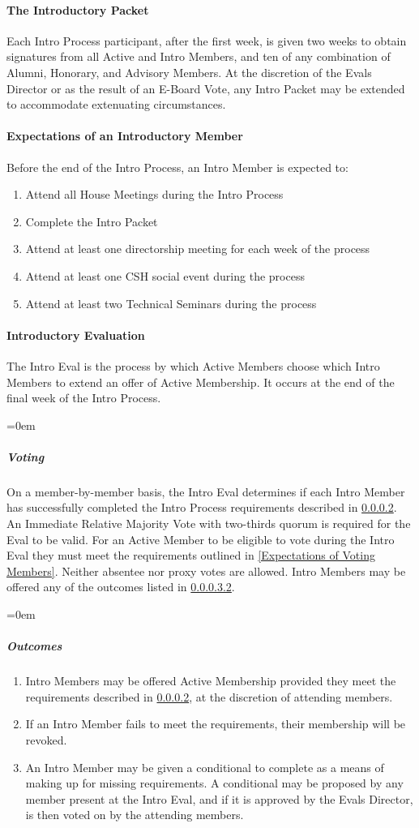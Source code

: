 \documentclass{article}
\newcommand{\asubsubsection}[1]{\paragraph{#1} \label{#1}}
\newcommand{\asubsubsubsection}[1]{\parindent=0em\subparagraph{#1} \label{#1}}
\begin{document}
\asubsubsection{The Introductory Packet}
Each Intro Process participant, after the first week, is given two weeks to obtain signatures from all Active and Intro Members, and ten of any combination of Alumni, Honorary, and Advisory Members.
At the discretion of the Evals Director or as the result of an E-Board Vote, any Intro Packet may be extended to accommodate extenuating circumstances.

\asubsubsection{Expectations of an Introductory Member}
\renewcommand{\theenumi}{\arabic{enumi}} %
Before the end of the Intro Process, an Intro Member is expected to:
\begin{enumerate}
	\item Attend all House Meetings during the Intro Process
	\item Complete the Intro Packet
	\item Attend at least one directorship meeting for each week of the process
	\item Attend at least one CSH social event during the process
	\item Attend at least two Technical Seminars during the process
\end{enumerate}

\asubsubsection{Introductory Evaluation}
The Intro Eval is the process by which Active Members choose which Intro Members to extend an offer of Active Membership.
It occurs at the end of the final week of the Intro Process.

\asubsubsubsection{Voting}
On a member-by-member basis, the Intro Eval determines if each Intro Member has successfully completed the Intro Process requirements described in \ref{Expectations of an Introductory Member}.
An Immediate Relative Majority Vote with two-thirds quorum is required for the Eval to be valid.
For an Active Member to be eligible to vote during the Intro Eval they must meet the requirements outlined in \ref{Expectations of Voting Members}.
Neither absentee nor proxy votes are allowed.
Intro Members may be offered any of the outcomes listed in \ref{Outcomes}.

\asubsubsubsection{Outcomes}
\renewcommand{\theenumi}{\alph{enumi}} %
\begin{enumerate}
	\item Intro Members may be offered Active Membership provided they meet the requirements described in \ref{Expectations of an Introductory Member}, at the discretion of attending members.
	\item If an Intro Member fails to meet the requirements, their membership will be revoked.
	\item An Intro Member may be given a conditional to complete as a means of making up for missing requirements.
	      A conditional may be proposed by any member present at the Intro Eval, and if it is approved by the Evals Director, is then voted on by the attending members.
\end{enumerate}
\end{document}
